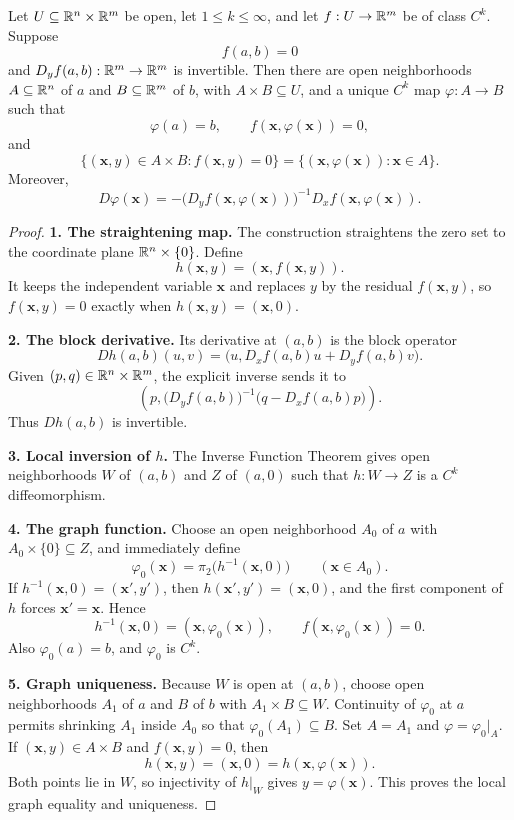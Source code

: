 \begin{theorem}
\label{thm:implicit-function}
Let $U\subseteq\mathbb{R}^n\times\mathbb{R}^m$ be open, let $1\leq k\leq\infty$, and let
$f:U\to\mathbb{R}^m$ be of class $C^k$. Suppose
\[
f(a,b)=0
\]
and $D_yf(a,b):\mathbb{R}^m\to\mathbb{R}^m$ is invertible. Then there are open
neighborhoods $A\subseteq\mathbb{R}^n$ of $a$ and $B\subseteq\mathbb{R}^m$ of $b$,
with $A\times B\subseteq U$, and a unique $C^k$ map
$\varphi:A\to B$ such that
\[
\varphi(a)=b,\qquad f(\mathbf{x},\varphi(\mathbf{x}))=0,
\]
and
\[
\{(\mathbf{x},y)\in A\times B:f(\mathbf{x},y)=0\}
=\{(\mathbf{x},\varphi(\mathbf{x})):\mathbf{x}\in A\}.
\]
Moreover,
\[
D\varphi(\mathbf{x})
=-\bigl(D_yf(\mathbf{x},\varphi(\mathbf{x}))\bigr)^{-1}
  D_xf(\mathbf{x},\varphi(\mathbf{x})).
\]
\end{theorem}
\begin{proof}
\noindent\textbf{1. The straightening map.}
The construction straightens the zero set to the coordinate plane
$\mathbb{R}^n\times\{0\}$. Define
\[
h(\mathbf{x},y)=(\mathbf{x},f(\mathbf{x},y)).
\]
It keeps the independent variable $\mathbf{x}$ and replaces $y$ by the residual
$f(\mathbf{x},y)$, so $f(\mathbf{x},y)=0$ exactly when $h(\mathbf{x},y)=(\mathbf{x},0)$.
\par\medskip
{}
\noindent\textbf{2. The block derivative.}
Its derivative at $(a,b)$ is the block operator
\[
Dh(a,b)(u,v)
=\bigl(u,D_xf(a,b)u+D_yf(a,b)v\bigr).
\]
Given $(p,q)\in\mathbb{R}^n\times\mathbb{R}^m$, the explicit inverse sends it to
\[
\left(p,\bigl(D_yf(a,b)\bigr)^{-1}
\bigl(q-D_xf(a,b)p\bigr)\right).
\]
Thus $Dh(a,b)$ is invertible.

\noindent\textbf{3. Local inversion of $h$.}
The Inverse Function Theorem gives
open neighborhoods $W$ of $(a,b)$ and $Z$ of $(a,0)$ such that
$h:W\to Z$ is a $C^k$ diffeomorphism.

\noindent\textbf{4. The graph function.}
Choose an open neighborhood $A_0$ of $a$ with
$A_0\times\{0\}\subseteq Z$, and immediately define
\[
\varphi_0(\mathbf{x})=\pi_2\bigl(h^{-1}(\mathbf{x},0)\bigr)
\qquad(\mathbf{x}\in A_0).
\]
If $h^{-1}(\mathbf{x},0)=(\mathbf{x}',y')$, then $h(\mathbf{x}',y')=(\mathbf{x},0)$, and the first component
of $h$ forces $\mathbf{x}'=\mathbf{x}$. Hence
\[
h^{-1}(\mathbf{x},0)=(\mathbf{x},\varphi_0(\mathbf{x})),\qquad
f(\mathbf{x},\varphi_0(\mathbf{x}))=0.
\]
Also $\varphi_0(a)=b$, and $\varphi_0$ is $C^k$.

\noindent\textbf{5. Graph uniqueness.}
Because $W$ is open at $(a,b)$, choose open neighborhoods $A_1$ of $a$
and $B$ of $b$ with $A_1\times B\subseteq W$. Continuity of $\varphi_0$
at $a$ permits shrinking $A_1$ inside $A_0$ so that
$\varphi_0(A_1)\subseteq B$. Set $A=A_1$ and
$\varphi=\varphi_0|_A$. If $(\mathbf{x},y)\in A\times B$ and $f(\mathbf{x},y)=0$, then
\[
h(\mathbf{x},y)=(\mathbf{x},0)=h(\mathbf{x},\varphi(\mathbf{x})).
\]
Both points lie in $W$, so injectivity of $h|_W$ gives $y=\varphi(\mathbf{x})$.
This proves the local graph equality and uniqueness.


\end{proof}

